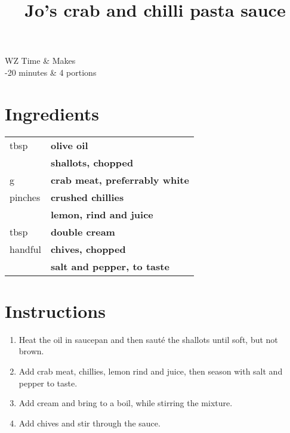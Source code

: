 \documentclass[main.tex]{subfiles}
\title{Jo's crab and chilli pasta sauce}
\begin{document}
\maketitle%

\begin{margintable}
\begin{tabularx}{\textwidth}{WZ}
Time & Makes\\ 
-20 minutes & 4 portions\\
\end{tabularx}
\end{margintable}


\section{Ingredients}

\vspace*{-\baselineskip}
\begin{table}[ht]
	\begin{tabularx}{\textwidth}{>{\hsize=0.333\hsize}X>{\bf\hsize=1\hsize}X}
	\unit[2]{tbsp} & olive oil\\
	\unit[2]{} & shallots, chopped\\
	\unit[200]{g} & crab meat, preferrably white\\
	\unit[1--2]{pinches} & crushed chillies\\
	\unit[1]{} & lemon, rind and juice\\
	\unit[4]{tbsp} & double cream \\
	\unit[1]{handful} & chives, chopped \\
    \unit[]{} & salt and pepper, to taste
	\end{tabularx}
\end{table}

\section{Instructions}

\begin{enumerate}	
	\item Heat the oil in saucepan and then saut\'{e} the shallots until soft, but not brown.
	
	\item Add crab meat, chillies, lemon rind and juice, then season with salt and pepper to taste.
	
	\item Add cream and bring to a boil, while stirring the mixture.
	
	\item Add chives and stir through the sauce.
	
\end{enumerate}

\end{document}
